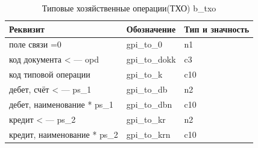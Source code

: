 

\begin{table}[!htbp]
    \centering
    \scriptsize
    \caption{Типовые хозяйственные операции(ТХО) \gpiFIO\/b\_txo}
    \begin{tabular}{|l|l|l|} 

                                                                                       \hline
\textbf{Реквизит}               &\textbf{Обозначение}   &\textbf{Тип и значность}   \\ \hline
поле связи =0                   &gpi\_to\_0             &n1                         \\ \hline
код документа < --- opd         &gpi\_to\_dokk          &c3                         \\ \hline
код типовой операции            &gpi\_to\_k             &c10                        \\ \hline
дебет, счёт < --- ps\_1         &gpi\_to\_db            &n2                         \\ \hline
дебет, наименование * ps\_1     &gpi\_to\_dbn           &c10                        \\ \hline
кредит < --- ps\_2              &gpi\_to\_kr            &n2                         \\ \hline
кредит, наименование * ps\_2    &gpi\_to\_krn           &c10                        \\ \hline

    \end{tabular}
\end{table}

